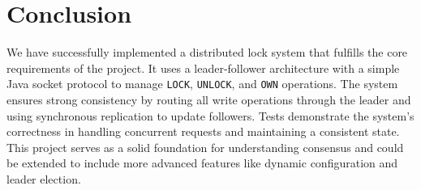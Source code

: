 \documentclass[a4paper,11pt]{article}
\begin{document}
\section{Conclusion}
We have successfully implemented a distributed lock system that fulfills the core requirements of the project. It uses a leader-follower architecture with a simple Java socket protocol to manage \texttt{LOCK}, \texttt{UNLOCK}, and \texttt{OWN} operations. The system ensures strong consistency by routing all write operations through the leader and using synchronous replication to update followers. Tests demonstrate the system's correctness in handling concurrent requests and maintaining a consistent state. This project serves as a solid foundation for understanding consensus and could be extended to include more advanced features like dynamic configuration and leader election.
\end{document}
